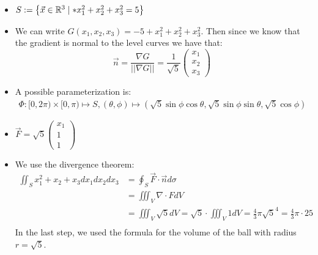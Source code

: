 \documentclass[11pt]{article}
\begin{document}
\begin{solution}     
    \begin{itemize}
    \item $S := \left\{ \vec x \in \bbR^3 \suchthat* x_1^2 + x_2^2 + x_3^2 = 5 \right\}$
    \item We can write $G(x_1,x_2,x_3) = -5 + x_1^2 + x_2^2 + x_3^2$. Then since we know that the gradient is normal to the level curves we have that:
    $$
    \vec{n} = \frac{\nabla G}{||\nabla G||} = \frac{1}{\sqrt{5}}\begin{pmatrix}
    x_1\\x_2\\x_3
    \end{pmatrix}
    $$
    \item A possible parameterization is:
     \begin{align*}
        \Phi: [0,2\pi)\times[0,\pi) \mapsto S, (\theta,\phi) \mapsto (\sqrt{5}\sin\phi\cos\theta,\sqrt{5}\sin\phi\sin\theta,\sqrt{5}\cos\phi)
     \end{align*}
    \item $\vec{F} = \sqrt{5}\begin{pmatrix}x_1\\1\\1\end{pmatrix}$
    \item 
     We use the divergence theorem:
     \begin{align*}
        \iint_{S} x_1^2 + x_2 + x_3 dx_1 dx_2 dx_3 & = \oint_{S} \vec{F}\cdot\vec{n} d\sigma \\
		& = \iiint_V \nabla \cdot F dV\\
		& = \iiint_V \sqrt{5} dV = \sqrt{5} \cdot \iiint_V 1 dV = \frac{4}{3}\pi\sqrt{5}^4 =  \frac{4}{3}\pi\cdot 25\\
     \end{align*}
     In the last step, we used the formula for the volume of the ball with radius $r=\sqrt{5}$.
    \end{itemize}
\end{solution}
\end{document}
